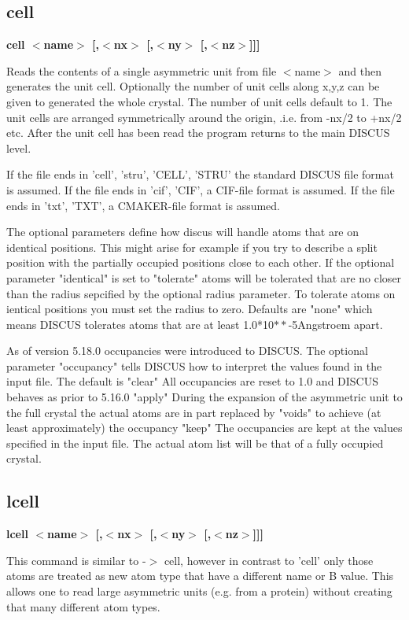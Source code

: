 \subsection*{cell}
{\bf cell $ <$name$> $ [,$ <$nx$> $ [,$ <$ny$> $ [,$ <$nz$> $]]] \par }
\begin{MacVerbatim}
\end{MacVerbatim}
\vspace{3pt}
Reads the contents of a single asymmetric unit from file $ <$name$> $ and 
then generates the unit cell. 
Optionally the number of unit cells along x,y,z can be given to 
generated the whole crystal. The number of unit cells default to 1. 
The unit cells are arranged symmetrically around the origin, .i.e. 
from -nx/2 to +nx/2 etc. 
After the unit cell has been read the program returns to the main 
DISCUS level. 
\par
If the file ends in 'cell', 'stru', 'CELL', 'STRU' the standard 
DISCUS file format is assumed. 
If the file ends in 'cif', 'CIF', a CIF-file format is assumed. 
If the file ends in 'txt', 'TXT', a CMAKER-file format is assumed. 
\par
The optional parameters define how discus will handle atoms that 
are on identical positions. This might arise for example if you 
try to describe a split position with the partially occupied 
positions close to each other. 
If the optional parameter "identical" is set to "tolerate" 
atoms will be tolerated that are no closer than the radius 
sepcified by the optional radius parameter. To tolerate 
atoms on ientical positions you must set the radius to zero. 
Defaults are "none" which means DISCUS tolerates atoms 
that are at least 1.0*10$**$-5Angstroem apart. 
\par
As of version 5.18.0 occupancies were introduced to DISCUS. 
The optional parameter "occupancy" tells DISCUS how to 
interpret the values found in the input file. The default is 
"clear" All occupancies are reset to 1.0 and DISCUS behaves 
        as prior to 5.16.0 
"apply" During the expansion of the asymmetric unit to the 
        full crystal the actual atoms are in part replaced 
        by "voids" to achieve (at least approximately) the 
        occupancy 
"keep"  The occupancies are kept at the values specified 
        in the input file. The actual atom list will be that 
        of a fully occupied crystal. 
\subsection*{lcell}
{\bf lcell $ <$name$> $ [,$ <$nx$> $ [,$ <$ny$> $ [,$ <$nz$> $]]] \par }
\par
\vspace{3pt}
This command is similar to -$> $ cell, however in contrast to 'cell' 
only those atoms are treated as new atom type that have a different 
name or B value. This allows one to read large asymmetric units 
(e.g. from a protein) without creating that many different atom types. 
